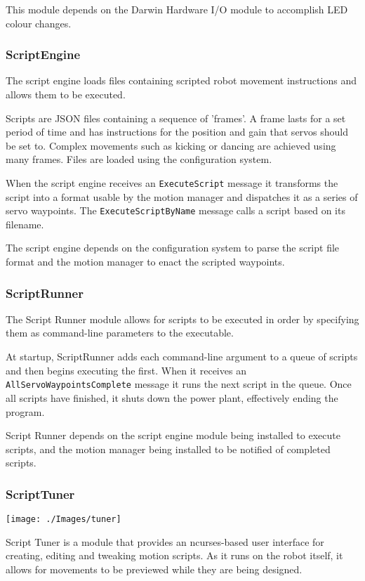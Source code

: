 \documentclass[english,12pt]{scrartcl}
\begin{document}
				This module depends on the Darwin Hardware I/O module to accomplish LED colour
				changes.


			\subsubsection{ScriptEngine}
				The script engine loads files containing scripted robot movement instructions and
				allows them to be executed.

				Scripts are JSON files containing a sequence of 'frames'. A frame lasts for a
				set period of time and has instructions for the position and gain that servos
				should be set to. Complex movements such as kicking or dancing are achieved
				using many frames. Files are loaded using the configuration system.

				When the script engine receives an \texttt{ExecuteScript} message it transforms
				the script into a format usable by the motion manager and dispatches it as a
				series of servo waypoints. The \texttt{ExecuteScriptByName} message calls a script
				based on its filename.

				The script engine depends on the configuration system to parse the script file
				format and the motion manager to enact the scripted waypoints.


			\subsubsection{ScriptRunner}
				The Script Runner module allows for scripts to be executed in order by specifying
				them as command-line parameters to the executable.

				At startup, ScriptRunner adds each command-line argument to a queue of scripts
				and then begins executing the first. When it receives an
				\texttt{AllServoWaypointsComplete} message it runs the next script in the queue.
				Once all scripts have finished, it shuts down the power plant, effectively ending
				the program.

				Script Runner depends on the script engine module being installed to execute
				scripts, and the motion manager being installed to be notified of completed
				scripts.

			\subsubsection{ScriptTuner}
				\texttt{[image: ./Images/tuner]}

				Script Tuner is a module that provides an ncurses-based user interface for
				creating, editing and tweaking motion scripts. As it runs on the robot itself,
				it allows for movements to be previewed while they are being designed.
\end{document}
